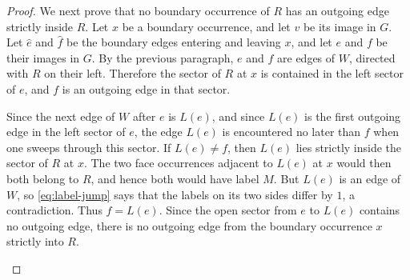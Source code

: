 \documentclass[11pt]{amsart}
\theoremstyle{plain}
\theoremstyle{definition}
\theoremstyle{remark}
\begin{document}
\begin{proof}
We next prove that no boundary occurrence of $R$ has an outgoing edge strictly inside $R$. Let $x$ be a boundary occurrence, and let $v$ be its image in $G$. Let $\hat e$ and $\hat f$ be the boundary edges entering and leaving $x$, and let $e$ and $f$ be their images in $G$. By the previous paragraph, $e$ and $f$ are edges of $W$, directed with $R$ on their left. Therefore the sector of $R$ at $x$ is contained in the left sector of $e$, and $f$ is an outgoing edge in that sector.

Since the next edge of $W$ after $e$ is $L(e)$, and since $L(e)$ is the first outgoing edge in the left sector of $e$, the edge $L(e)$ is encountered no later than $f$ when one sweeps through this sector. If $L(e) \neq f$, then $L(e)$ lies strictly inside the sector of $R$ at $x$. The two face occurrences adjacent to $L(e)$ at $x$ would then both belong to $R$, and hence both would have label $M$. But $L(e)$ is an edge of $W$, so \eqref{eq:label-jump} says that the labels on its two sides differ by $1$, a contradiction. Thus $f = L(e)$. Since the open sector from $e$ to $L(e)$ contains no outgoing edge, there is no outgoing edge from the boundary occurrence $x$ strictly into $R$.

\begin{figure}[ht]
\centering
{}
\end{figure}
\end{proof}
\end{document}
